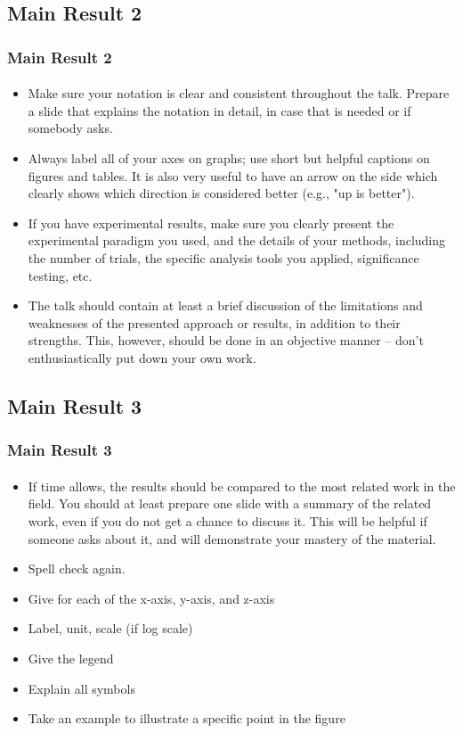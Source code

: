 \documentclass[11pt]{beamer}              %
\begin{document}
\subsection{Main Result 2}
\begin{frame}
\frametitle{Main Result 2}
\framesubtitle{}
\begin{itemize}
\item Make sure your notation is clear and consistent throughout the talk. Prepare a slide that explains the notation in detail, in case that is needed or if somebody asks.
\item Always label all of your axes on graphs; use short but helpful captions on figures and tables. It is also very useful to have an arrow on the side which clearly shows which direction is considered better (e.g., "up is better").
\item If you have experimental results, make sure you clearly present the experimental paradigm you used, and the details of your methods, including the number of trials, the specific analysis tools you applied, significance testing, etc.
\item The talk should contain at least a brief discussion of the limitations and weaknesses of the presented approach or results, in addition to their strengths. This, however, should be done in an objective manner -- don't enthusiastically put down your own work.
\end{itemize}
\end{frame}


\subsection{Main Result 3}
\begin{frame}
\frametitle{Main Result 3}
\framesubtitle{}
\begin{itemize}
\item If time allows, the results should be compared to the most related work in the field. You should at least prepare one slide with a summary of the related work, even if you do not get a chance to discuss it. This will be helpful if someone asks about it, and will demonstrate your mastery of the material.
\item Spell check again.
\item Give for each of the x-axis, y-axis, and z-axis
\item Label, unit, scale (if log scale)
\item Give the legend
\item Explain all symbols
\item Take an example to illustrate a specific point in the figure
\end{itemize}
\end{frame}
\end{document}
